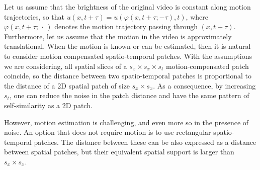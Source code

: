 \documentclass[10pt, a4paper]{article}
\begin{document}
Let us assume that 
the brightness of the original video is constant along motion trajectories, so
that $u(x,t + \tau) = u(\varphi(x,t + \tau; -\tau),t)$, where
$\varphi(x,t+\tau;\, \cdot\, )$ denotes the motion trajectory passing through
$(x,t + \tau)$.
Furthermore, let us assume that the motion in the video is approximately
translational.
When the motion is known or can be estimated, then it is natural to consider
motion compensated spatio-temporal patches. 
With the assumptions we are considering, all spatial slices of a $s_x\times s_x\times s_t$ motion-compensated patch
coincide, so the distance between two spatio-temporal patches is proportional to
the distance of a 2D spatial patch of size $s_x\times s_x$.
%
As a consequence, by increasing $s_t$, one can reduce the 
noise in the patch distance and have the same pattern of self-similarity as a 
2D patch.

However, motion estimation is challenging, and even more so in the presence of noise.
An option that does not require motion is to use rectangular spatio-temporal patches.
The distance between these can be also expressed as a distance between spatial patches,
but their equivalent spatial support is larger than $s_x\times s_x$.
\end{document}
